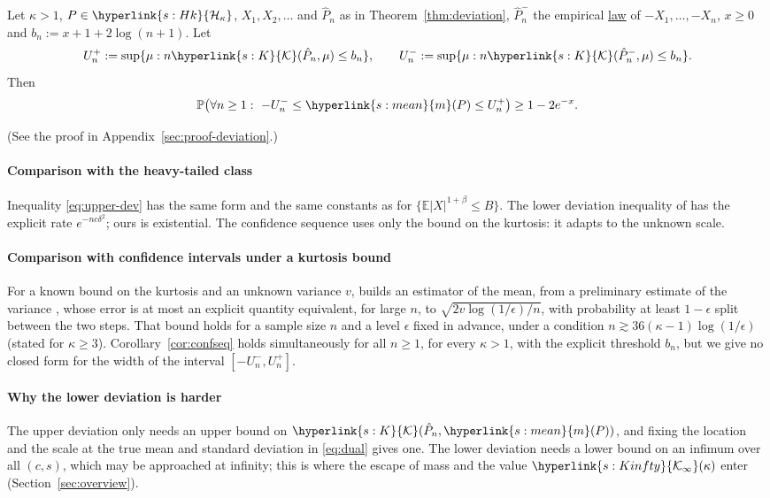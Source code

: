 \documentclass[11pt]{article}
\newcommand{\E}{\mathbb{E}}
\newcommand{\Prob}{\mathbb{P}}
\newcommand{\sy}[2]{{\hyperlink{#1}{#2}}}
\newcommand{\term}[2]{\hyperlink{#1}{#2}}
\newcommand{\mean}{\sy{s:mean}{m}}
\newcommand{\Hk}{\sy{s:Hk}{\mathcal{H}_{\kappa}}}
\newcommand{\Kc}{\sy{s:K}{\mathcal{K}}}
\newcommand{\Kinfty}{\sy{s:Kinfty}{\mathcal{K}_{\infty}}}
\begin{document}
\begin{corollary}\label{cor:confseq}
Let $\kappa>1$, $P\in\Hk$, $X_1,X_2,\dots$ and $\hat P_n$ as in Theorem~\ref{thm:deviation}, $\hat P^-_n$ the
empirical \term{w:law}{law} of $-X_1,\dots,-X_n$, $x\ge0$ and $b_n:=x+1+2\log(n+1)$. Let
\begin{equation*}
  U^+_n:=\sup\{\mu:n\Kc(\hat P_n,\mu)\le b_n\},\qquad U^-_n:=\sup\{\mu:n\Kc(\hat P^-_n,\mu)\le b_n\}.
\end{equation*}
Then
\begin{equation*}
  \Prob\bigl(\forall n\ge1:\ -U^-_n\le\mean(P)\le U^+_n\bigr)\ge1-2e^{-x}.
\end{equation*}
\end{corollary}

(See the proof in Appendix~\ref{sec:proof-deviation}.)

\paragraph{Comparison with the heavy-tailed class} Inequality \eqref{eq:upper-dev} has the same form and
the same constants as \citet[Proposition~5]{AJK21} for $\{\E|X|^{1+\beta}\le B\}$. The lower deviation inequality of
\citet[Lemma~6]{AJK21} has the explicit rate $e^{-nc\delta^2}$; ours is existential. The confidence sequence
uses only the bound on the kurtosis: it adapts to the unknown scale.

\paragraph{Comparison with confidence intervals under a kurtosis bound} For a known bound on the kurtosis and an
unknown variance $v$, \citet[Section~4.2, Proposition~4.5]{Cat12} builds an estimator of the mean, from a
preliminary estimate of the variance \citep[Corollary~4.3]{Cat12}, whose error is at most an explicit quantity
equivalent, for large $n$, to $\sqrt{2v\log(1/\epsilon)/n}$, with probability at least $1-\epsilon$ split between the two
steps. That bound holds for a sample size $n$ and a level $\epsilon$ fixed in advance, under a condition
$n\gtrsim36(\kappa-1)\log(1/\epsilon)$ (stated for $\kappa\ge3$). Corollary~\ref{cor:confseq} holds simultaneously for all
$n\ge1$, for every $\kappa>1$, with the explicit threshold $b_n$, but we give no closed form for the width of the
interval $[-U^-_n,U^+_n]$.

\paragraph{Why the lower deviation is harder} The upper deviation only needs an upper bound on
$\Kc(\hat P_n,\mean(P))$, and fixing the location and the scale at the true mean and standard deviation in
\eqref{eq:dual} gives one. The lower deviation needs a lower bound on an infimum over all $(c,s)$, which may
be approached at infinity; this is where the escape of mass and the value $\Kinfty(\kappa)$ enter
(Section~\ref{sec:overview}).
\end{document}
